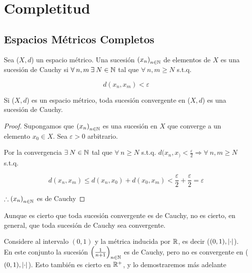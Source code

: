 \chapter{Completitud}

\section{Espacios Métricos Completos}

\begin{definition} \label{def411}
    Sea ($X,d$) un espacio métrico. Una sucesión ${\left(x_n\right)}_{n \in \mathbb{N}}$ de elementos de $X$ es una sucesión de Cauchy si $\forall \: n, m \: \exists \: N \in \mathbb{N} $ tal que $\forall \: n, m  \geqslant N$ s.t.q.

    $$d(x_n,x_m) < \varepsilon$$
\end{definition}

\begin{theorem} \label{theom411}
    Si ($X,d$) es un espacio métrico, toda sucesión convergente en ($X,d$) es una sucesión de Cauchy.
\end{theorem}

\begin{proof}
    Supongamos que ${\left(x_n\right)}_{n \in \mathbb{N}}$ es una sucesión en $X$ que converge a un elemento $x_0 \in X$. Sea $\varepsilon > 0$ arbitrario.

    Por la convergencia $\exists \: N \in \mathbb{N}$ tal que $\forall \: n  \geqslant N$  s.t.q. $d(x_n,x_) < \frac{\varepsilon}{2} \Rightarrow \forall \: n, m  \geqslant N$ s.t.q.


    $$d(x_n,x_m) \leqslant d(x_n,x_0) + d(x_0,x_m) < \frac{\varepsilon}{2} + \frac{\varepsilon}{2} = \varepsilon$$

    $\therefore {(x_n)}_{n \in \mathbb{N}}$ es de Cauchy
\end{proof}

\begin{remark}
    Aunque es cierto que toda sucesión convergente es de Cauchy, no es cierto, en general, que toda sucesión de Cauchy sea convergente.
\end{remark}

\begin{eg}
    Considere al intervalo $(0,1)$ y la métrica inducida por $\mathbb{R}$, es decir ($(0,1), \abs{\cdot}$). En este conjunto la sucesión ${\left( \frac{1}{n+1} \right)}_{n \in \mathbb{N}}$ es de Cauchy, pero no es convergente en ($(0,1), \abs{\cdot}$). Esto también es cierto en $\mathbb{R}^+$, y lo demostraremos más adelante
\end{eg}

